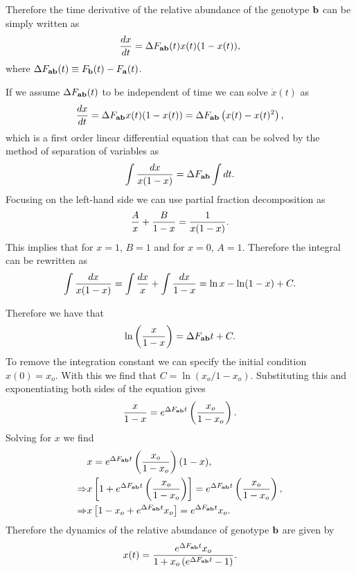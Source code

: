 Therefore the time derivative of the relative abundance of the genotype $\mathbf{b}$
can be simply written as
\begin{equation}
  {d{x} \over dt} = \Delta F_{\mathbf{ab}}(t) x(t) (1 - x(t)),
\end{equation}
where $\Delta F_{\mathbf{ab}}(t) \equiv F_{\mathbf{b}}(t) - F_{\mathbf{a}}(t)$.

If we assume $\Delta F_{\mathbf{ab}}(t)$ to be independent of time we can solve $\dot x(t)$ as
\begin{equation}
  {d{x} \over dt} = \Delta F_{\mathbf{ab}} x(t) (1 - x(t)) = \Delta F_{\mathbf{ab}} \left( x(t) - x(t)^2 \right),
\end{equation}
which is a first order linear differential equation that can be solved by the
method of separation of variables as
\begin{equation}
  \int {dx \over x (1 - x)} = \Delta F_{\mathbf{ab}} \int dt.
\end{equation}
Focusing on the left-hand side we can use partial fraction decomposition as
\begin{equation}
  {A \over x} + {B \over 1 - x} = {1 \over x (1 - x)}.
\end{equation}
This implies that for $x = 1$, $B = 1$ and for $x = 0$, $A = 1$. Therefore the
integral can be rewritten as
\begin{equation}
  \int {dx \over x (1 - x)} = \int {dx \over x} + \int {dx \over 1 - x}
  = \ln x - \ln (1 - x) + C.
\end{equation}

Therefore we have that
\begin{equation}
  \ln \left( {x \over 1 - x} \right) = \Delta F_{\mathbf{ab}} t + C.
\end{equation}
To remove the integration constant we can specify the initial condition
$x(0) = x_o$. With this we find that $C = \ln (x_o / 1 - x_o)$. Substituting
this and exponentiating both sides of the equation gives
\begin{equation}
  {x \over 1 - x} = e^{\Delta F_{\mathbf{ab}} t} \left( {x_o \over 1 - x_o } \right).
\end{equation}
Solving for $x$ we find
\begin{align}
  &x = e^{\Delta F_{\mathbf{ab}} t} \left( {x_o} \over 1 - x_o \right)(1 - x),\\
  \Rightarrow &x \left[ 1 + e^{\Delta F_{\mathbf{ab}} t} \left( {x_o} \over 1 - x_o \right) \right]
  = e^{\Delta F_{\mathbf{ab}} t} \left( {x_o \over 1 - x_o} \right),\\
  \Rightarrow &x \left[ 1 - x_o + e^{\Delta F_{\mathbf{ab}} t} x_o \right] = e^{\Delta F_{\mathbf{ab}} t} x_o.
\end{align}
Therefore the dynamics of the relative abundance of genotype $\mathbf{b}$ are given
by
\begin{equation}
  x(t) = {e^{\Delta F_{\mathbf{ab}} t} x_o \over 1 + x_o \left( e^{\Delta F_{\mathbf{ab}} t} - 1 \right)}.
\end{equation}

